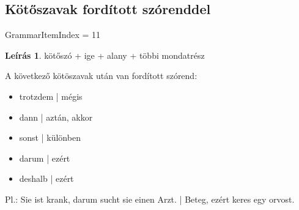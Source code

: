 \documentclass{article}
\theoremstyle{definition}
\newtheorem*{desc}{Leírás}
\begin{document}
\subsection{Kötőszavak fordított szórenddel}

GrammarItemIndex = 11

\begin{desc}

kötőszó + ige + alany + többi mondatrész

A következő kötöszavak után van fordított szórend:
\begin{itemize}
\item trotzdem | mégis
\item dann | aztán, akkor
\item sonst | különben
\item darum | ezért
\item deshalb | ezért
\end{itemize}

Pl.: Sie ist krank, darum sucht sie einen Arzt. | Beteg, ezért keres egy orvost.
\end{desc}
\end{document}
